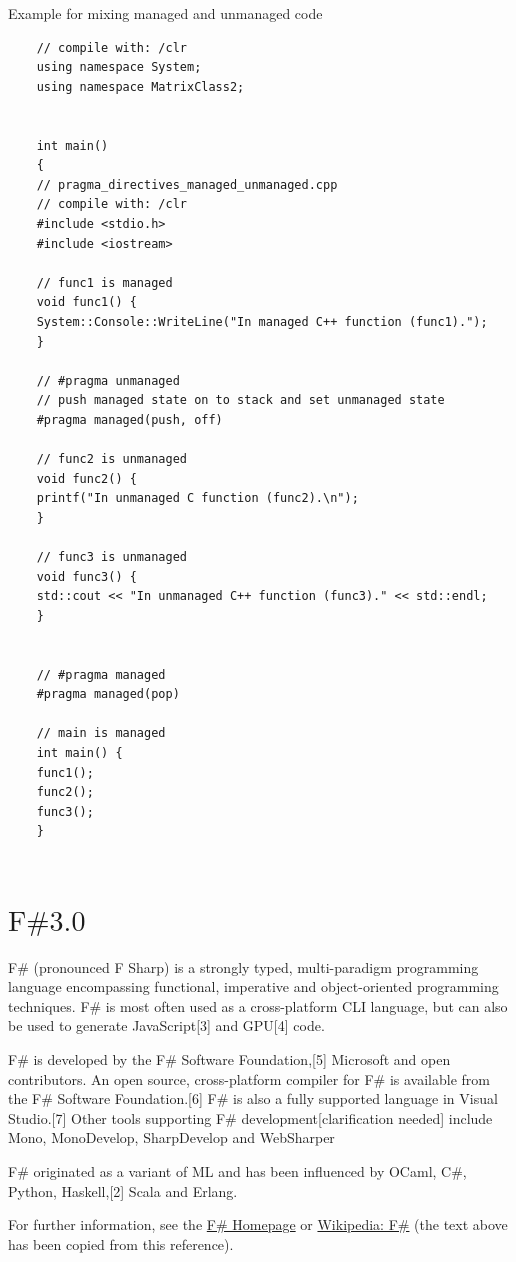 	
	
	\noindent Example for mixing managed and unmanaged code 
	
	
	\begin{lstlisting}
	// compile with: /clr
	using namespace System;
	using namespace MatrixClass2;
	
	
	int main() 
	{
	// pragma_directives_managed_unmanaged.cpp
	// compile with: /clr
	#include <stdio.h>
	#include <iostream>
	
	// func1 is managed
	void func1() {
	System::Console::WriteLine("In managed C++ function (func1).");
	}
	
	// #pragma unmanaged
	// push managed state on to stack and set unmanaged state
	#pragma managed(push, off)
	
	// func2 is unmanaged
	void func2() {
	printf("In unmanaged C function (func2).\n");
	}
	
	// func3 is unmanaged
	void func3() {
	std::cout << "In unmanaged C++ function (func3)." << std::endl;
	}
	
	
	// #pragma managed
	#pragma managed(pop)
	
	// main is managed
	int main() {
	func1();
	func2();
	func3();
	}
	
	\end{lstlisting}
	
	
	
	\newpage
	\section{\texorpdfstring{$\text{F\# 3.0 } $}{FSharp}}
	F\# (pronounced F Sharp) is a strongly typed, multi-paradigm programming language encompassing functional, imperative and object-oriented programming techniques. F\# is most often used as a cross-platform CLI language, but can also be used to generate JavaScript[3] and GPU[4] code.
	
	F\# is developed by the F\# Software Foundation,[5] Microsoft and open contributors. An open source, cross-platform compiler for F\# is available from the F\# Software Foundation.[6] F\# is also a fully supported language in Visual Studio.[7] Other tools supporting F\# development[clarification needed] include Mono, MonoDevelop, SharpDevelop and WebSharper
	
	F\# originated as a variant of ML and has been influenced by OCaml, C\#, Python, Haskell,[2] Scala and Erlang.
	
	
	For further information, see the \href{http://fsharp.org/}{F\# Homepage} or  \href{http://en.wikipedia.org/wiki/F_Sharp_(programming_language)}{Wikipedia: F\#} (the text above has been copied from this reference).
	
